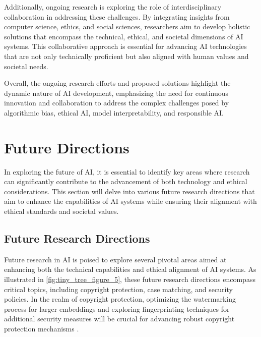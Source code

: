 Additionally, ongoing research is exploring the role of interdisciplinary collaboration in addressing these challenges. By integrating insights from computer science, ethics, and social sciences, researchers aim to develop holistic solutions that encompass the technical, ethical, and societal dimensions of AI systems. This collaborative approach is essential for advancing AI technologies that are not only technically proficient but also aligned with human values and societal needs.



Overall, the ongoing research efforts and proposed solutions highlight the dynamic nature of AI development, emphasizing the need for continuous innovation and collaboration to address the complex challenges posed by algorithmic bias, ethical AI, model interpretability, and responsible AI.













\section{Future Directions} \label{sec:Future Directions}

In exploring the future of AI, it is essential to identify key areas where research can significantly contribute to the advancement of both technology and ethical considerations. This section will delve into various future research directions that aim to enhance the capabilities of AI systems while ensuring their alignment with ethical standards and societal values. 






\subsection{Future Research Directions} \label{subsec:Future Research Directions}

Future research in AI is poised to explore several pivotal areas aimed at enhancing both the technical capabilities and ethical alignment of AI systems. As illustrated in \autoref{fig:tiny_tree_figure_5}, these future research directions encompass critical topics, including copyright protection, case matching, and security policies. In the realm of copyright protection, optimizing the watermarking process for larger embeddings and exploring fingerprinting techniques for additional security measures will be crucial for advancing robust copyright protection mechanisms \cite{wang2024espewrobustcopyrightprotection}. 

